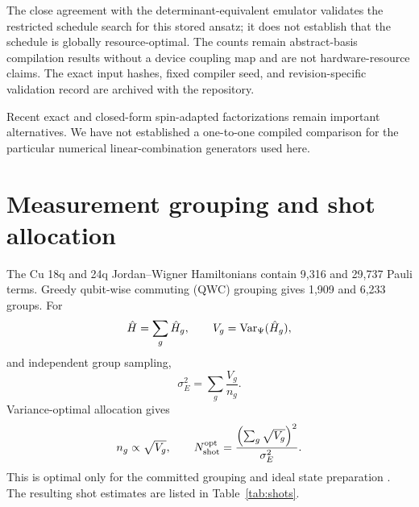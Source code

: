 \documentclass[
 aip,
 jcp,
 amsmath,amssymb,
 preprint
]{revtex4-2}
\begin{document}
The close agreement with the determinant-equivalent emulator validates the restricted schedule search for this stored ansatz; it does not establish that the schedule is globally resource-optimal.
The counts remain abstract-basis compilation results without a device coupling map and are not hardware-resource claims.
The exact input hashes, fixed compiler seed, and revision-specific validation record are archived with the repository.

Recent exact and closed-form spin-adapted factorizations \cite{magoulas2025closedform,jain2026factorization} remain important alternatives.
We have not established a one-to-one compiled comparison for the particular numerical linear-combination generators used here.

\section{Measurement grouping and shot allocation}

The Cu 18q and 24q Jordan--Wigner Hamiltonians contain 9,316 and 29,737 Pauli terms.
Greedy qubit-wise commuting (QWC) grouping gives 1,909 and 6,233 groups.
For
\begin{equation}
\hat H=\sum_g\hat H_g,\qquad
V_g={\rm Var}_\Psi(\hat H_g),
\end{equation}
and independent group sampling,
\begin{equation}
\sigma_E^2=\sum_g\frac{V_g}{n_g}.
\end{equation}
Variance-optimal allocation gives
\begin{equation}
n_g\propto\sqrt{V_g},
\qquad
N_{\rm shot}^{\rm opt}
=
\frac{\left(\sum_g\sqrt{V_g}\right)^2}{\sigma_E^2}.
\end{equation}
This is optimal only for the committed grouping and ideal state preparation \cite{verteletskyi2020measurement}.
The resulting shot estimates are listed in Table~\ref{tab:shots}.
\end{document}
